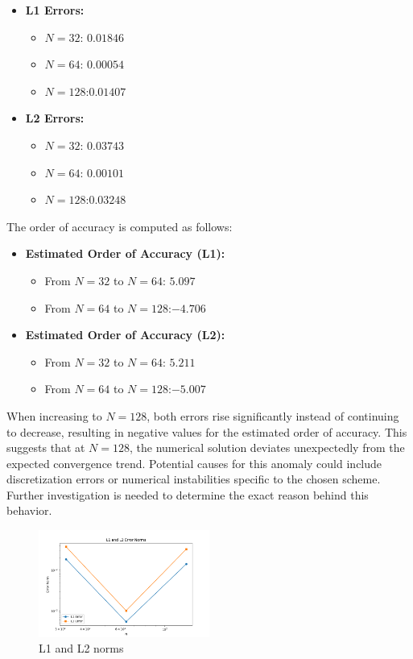 \documentclass{article}
\begin{document}
\begin{itemize}
    \item \textbf{L1 Errors:}
    \begin{itemize}
        \item $N = 32$: \quad $0.01846$
        \item $N = 64$: \quad $0.00054$
        \item $N = 128$:\quad $0.01407$
    \end{itemize}
    
    \item \textbf{L2 Errors:}
    \begin{itemize}
        \item $N = 32$: \quad $0.03743$
        \item $N = 64$: \quad $0.00101$
        \item $N = 128$:\quad $0.03248$
    \end{itemize}
\end{itemize}
The order of accuracy is computed as follows:

\begin{itemize}
    \item \textbf{Estimated Order of Accuracy (L1):}
    \begin{itemize}
        \item From $N = 32$ to $N = 64$: \quad $5.097$
        \item From $N = 64$ to $N = 128$:\quad $-4.706$
    \end{itemize}
    
    \item \textbf{Estimated Order of Accuracy (L2):}
    \begin{itemize}
        \item From $N = 32$ to $N = 64$: \quad $5.211$
        \item From $N = 64$ to $N = 128$:\quad $-5.007$
    \end{itemize}
\end{itemize}
When increasing to $N = 128$, both errors rise significantly instead of continuing to decrease, 
resulting in negative values for the estimated order of accuracy. This suggests that at $N = 128$, the numerical solution deviates
unexpectedly from the expected convergence trend. Potential causes for this anomaly could include discretization errors or numerical 
instabilities specific to the chosen scheme. Further investigation is needed to determine the exact reason behind this behavior.

\begin{figure}[h!]
    \centering
    \includegraphics[width=0.5\textwidth]{FVM_Error.png}
    \caption{L1 and L2 norms}
  \end{figure}
\end{document}
